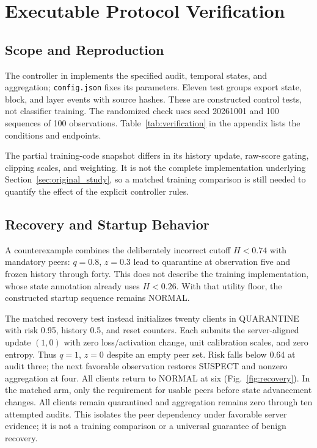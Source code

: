 \documentclass[conference,compsoc]{IEEEtran}
\begin{document}
\FloatBarrier
\section{Executable Protocol Verification}
\label{sec:verification}

\subsection{Scope and Reproduction}

The controller in  implements the
specified audit, temporal states, and aggregation; \texttt{config.json} fixes
its parameters. Eleven test groups export state, block, and layer events with
source hashes. These are constructed control tests, not classifier training.
The randomized check uses seed 20261001 and 100 sequences of 100 observations.
Table~\ref{tab:verification} in the appendix lists the conditions and endpoints.

The partial training-code snapshot differs in its history update, raw-score
gating, clipping scales, and weighting. It is not the complete implementation
underlying Section~\ref{sec:original_study}, so a matched training comparison
is still needed to quantify the effect of the explicit controller rules.

\subsection{Recovery and Startup Behavior}

A counterexample combines the deliberately incorrect cutoff $H<0.74$ with
mandatory peers: $q=0.8$, $z=0.3$ lead to quarantine at observation five and
frozen history through forty. This does not describe the training
implementation, whose state annotation already uses $H<0.26$. With that
utility floor, the constructed startup sequence remains NORMAL.

The matched recovery test instead initializes twenty clients in QUARANTINE
with risk 0.95, history 0.5, and reset counters. Each submits the server-aligned
update $(1,0)$ with zero loss/activation change, unit calibration scales, and
zero entropy. Thus $q=1$, $z=0$ despite an empty peer set. Risk falls below
0.64 at audit three; the next favorable observation restores SUSPECT and
nonzero aggregation at four. All clients return to NORMAL at six
(Fig.~\ref{fig:recovery}). In the matched arm, only the requirement for usable
peers before state advancement changes. All clients remain quarantined and
aggregation remains zero through ten attempted audits. This isolates the peer
dependency under favorable server evidence; it is not a training comparison or
a universal guarantee of benign recovery.
\end{document}

